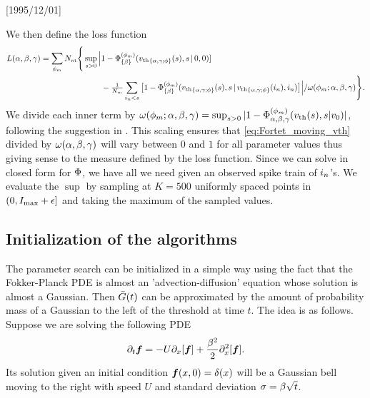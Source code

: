 \NeedsTeXFormat{LaTeX2e}[1995/12/01] \documentclass[10pt]{bmc_article}
\newenvironment{bmcformat}{\begin{raggedright}\baselineskip20pt\sloppy\setboolean{publ}{false}}{\end{raggedright}\baselineskip20pt\sloppy}
\begin{document}
\begin{bmcformat}
We then define the loss function
\begin{align}
L({\alpha},{\beta},{\gamma }) = 
\sum_{\phi_m} N_m \Bigg\{ 
\sup_{s > 0}
		 \Big|& 1 - {\Phi}^{(\phi_m)}_{\{{\beta}\}}({ v_{\textrm{th} } }_{\{{\alpha},{\gamma };\phi\}}(s), s \,|\,0,0) ] 
		 \notag
\\
		 &-  \tfrac{1}{N_m}\sum_{{ i_n} < s}
		 \big[1 - {\Phi}^{(\phi_m)}_{\{{\beta}\}}({ v_{\textrm{th} } }_{\{{\alpha},{\gamma };\phi\}}(s),s  \,|\,
		 { v_{\textrm{th} } }_{\{{\alpha},{\gamma };\phi\}}({ i_n}), { i_n}) \big] \Big| / \omega(\phi_m; {\alpha},{\beta},{\gamma })
		   \Bigg\}.
\label{eq:loss_function_fortet}
\end{align}
We divide each inner term by $\omega(\phi_m; {\alpha},{\beta},{\gamma }) =
\sup_{s > 0} |1 - {\Phi}^{(\phi_m)}_{{{\alpha},{\beta},{\gamma } }}({ v_{\textrm{th} } }(s), s|v_0) |$,
following the suggestion in
\cite{Ditlevsen2007}. This scaling ensures that \cref{eq:Fortet_moving_vth}
divided by $\omega({\alpha},{\beta},{\gamma })$ will vary between $0$ and $1$ for all parameter
values thus giving sense to the measure defined by the loss
function. Since we can solve in closed form for ${\Phi}$, we have all we
need given an observed spike train of 
${ i_n}$'s. We evaluate the $\sup$ by sampling at 
$K=500$ uniformly spaced points in $(0, I_{\max} + {\epsilon}]$ and taking the maximum
of the sampled values. 


\subsection{Initialization of the algorithms}
The parameter search can be initialized in a simple way using the fact that
the Fokker-Planck PDE is almost an 'advection-diffusion' equation whose solution is
almost a Gaussian. Then ${ \bar{G} }(t)$ can be approximated by the
amount of probability mass of a Gaussian to the left of the threshold at time $t$. The
idea is as follows. Suppose we are solving the following PDE
\begin{equation}
{\partial}_t { \boldsymbol{f} } = -U {\partial}_x [{ \boldsymbol{f} }] + \frac{{\beta}^2}{2} {\partial}^2_x [{ \boldsymbol{f} }].
\label{eq:FP_pde}
\end{equation}
Its solution given an initial condition ${ \boldsymbol{f} }(x,0) = \delta(x)$ will be a 
Gaussian bell moving to the right with speed $U$ and standard deviation ${\sigma } =
{\beta}\sqrt{t}$.


\end{bmcformat}
\end{document}
